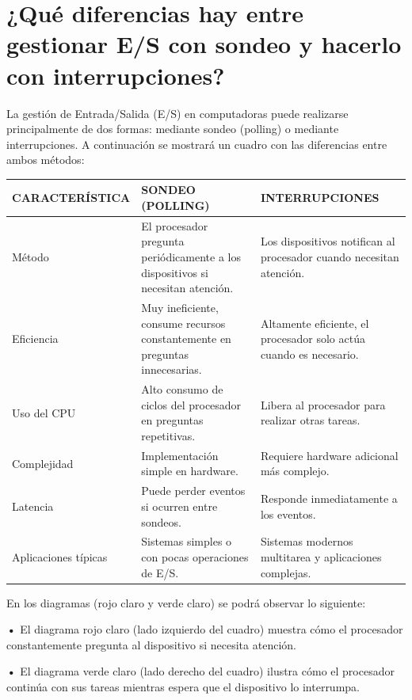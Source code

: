 \documentclass{article}
\begin{document}
\section{¿Qué diferencias hay entre gestionar E/S con sondeo y hacerlo con interrupciones?}

\quad

{La gestión de Entrada/Salida (E/S) en computadoras puede realizarse principalmente de dos formas: mediante sondeo (polling) o mediante interrupciones. A continuación se mostrará un cuadro con las diferencias entre ambos métodos:}

\quad

\begin{tabular}{| p{3.5cm} |p{4cm} | p{4cm} |}
    \hline
    CARACTERÍSTICA & SONDEO (POLLING) & INTERRUPCIONES \\
    \hline
    Método & El procesador pregunta periódicamente a los dispositivos si necesitan atención. & Los dispositivos notifican al procesador cuando necesitan atención.
\\
    \hline
    Eficiencia & Muy ineficiente, consume recursos constantemente en preguntas innecesarias. & Altamente eficiente, el procesador solo actúa cuando es necesario. \\
    \hline
    Uso del CPU & Alto consumo de ciclos del procesador en preguntas repetitivas. & Libera al procesador para realizar otras tareas. \\
    \hline
    Complejidad & Implementación simple en hardware. & Requiere hardware adicional más complejo. \\
    \hline
    Latencia & Puede perder eventos si ocurren entre sondeos. & Responde inmediatamente a los eventos. \\
    \hline
    Aplicaciones típicas & Sistemas simples o con pocas operaciones de E/S. & Sistemas modernos multitarea y aplicaciones complejas.
 \\
    \hline

\end{tabular}\vspace{0.8cm}

{En los diagramas (rojo claro y verde claro) se podrá observar lo siguiente:}

\quad


\textbf{    •} { El diagrama rojo claro (lado izquierdo del cuadro) muestra cómo el procesador constantemente pregunta al dispositivo si necesita atención.}

\textbf{    •} { El diagrama verde claro (lado derecho del cuadro) ilustra cómo el procesador continúa con sus tareas mientras espera que el dispositivo lo interrumpa.}
\end{document}
